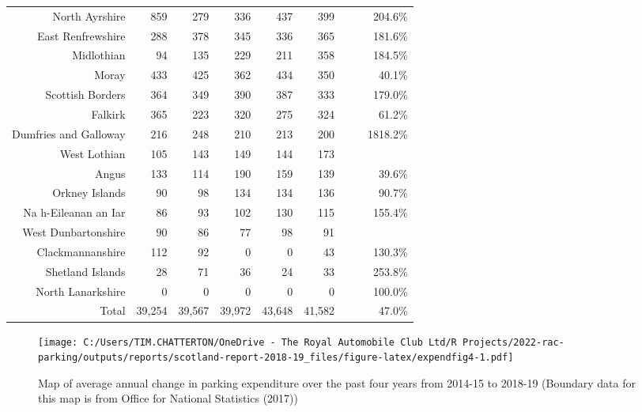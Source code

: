 \documentclass[
  12pt,
]{article}
\begin{document}
\begin{longtable}[t]{rrrrrrrrr}
North Ayrshire & 859 & 279 & 336 & 437 & 399 & \cellcolor{white}{ -8.7\%} & \cellcolor{white}{-17.4\%} & 204.6\%\\
East Renfrewshire & 288 & 378 & 345 & 336 & 365 & \cellcolor{white}{  8.6\%} & \cellcolor{white}{  6.1\%} & 181.6\%\\
Midlothian & 94 & 135 & 229 & 211 & 358 & \cellcolor{white}{ 69.7\%} & \cellcolor{white}{ 39.7\%} & 184.5\%\\
Moray & 433 & 425 & 362 & 434 & 350 & \cellcolor{white}{-19.4\%} & \cellcolor{white}{ -5.2\%} & 40.1\%\\
Scottish Borders & 364 & 349 & 390 & 387 & 333 & \cellcolor{white}{-14.0\%} & \cellcolor{white}{ -2.2\%} & 179.0\%\\
Falkirk & 365 & 223 & 320 & 275 & 324 & \cellcolor{white}{ 17.8\%} & \cellcolor{white}{ -2.9\%} & 61.2\%\\
Dumfries and Galloway & 216 & 248 & 210 & 213 & 200 & \cellcolor{white}{ -6.1\%} & \cellcolor{white}{ -1.9\%} & 1818.2\%\\
West Lothian & 105 & 143 & 149 & 144 & 173 & \cellcolor{white}{ 20.1\%} & \cellcolor{white}{ 13.3\%} & \\
Angus & 133 & 114 & 190 & 159 & 139 & \cellcolor{white}{-12.6\%} & \cellcolor{white}{  1.1\%} & 39.6\%\\
Orkney Islands & 90 & 98 & 134 & 134 & 136 & \cellcolor{white}{  1.5\%} & \cellcolor{white}{ 10.9\%} & 90.7\%\\
Na h-Eileanan an Iar & 86 & 93 & 102 & 130 & 115 & \cellcolor{white}{-11.5\%} & \cellcolor{white}{  7.5\%} & 155.4\%\\
West Dunbartonshire & 90 & 86 & 77 & 98 & 91 & \cellcolor{white}{ -7.1\%} & \cellcolor{white}{  0.3\%} & \\
Clackmannanshire & 112 & 92 & 0 & 0 & 43 & \cellcolor{white}{} & \cellcolor{white}{-21.3\%} & 130.3\%\\
Shetland Islands & 28 & 71 & 36 & 24 & 33 & \cellcolor{white}{ 37.5\%} & \cellcolor{white}{  4.2\%} & 253.8\%\\
North Lanarkshire & 0 & 0 & 0 & 0 & 0 & \cellcolor{white}{  0.0\%} & \cellcolor{white}{  0.0\%} & 100.0\%\\
\midrule
Total & 39,254 & 39,567 & 39,972 & 43,648 & 41,582 & \cellcolor{white}{ -4.7\%} & \cellcolor{white}{  1.5\%} & 47.0\%\\*
\end{longtable}
\endgroup{}

\begin{figure}
\centering
\texttt{[image: C:/Users/TIM.CHATTERTON/OneDrive - The Royal Automobile Club Ltd/R Projects/2022-rac-parking/outputs/reports/scotland-report-2018-19\_files/figure-latex/expendfig4-1.pdf]}
\caption{\label{fig:expendfig4}Map of average annual change in parking expenditure over the past four years from 2014-15 to 2018-19 (Boundary data for this map is from Office for National Statistics (2017))}
\end{figure}
\end{document}
